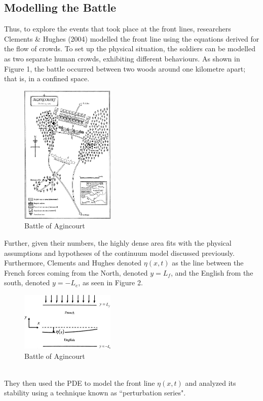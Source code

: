 \documentclass{article}
\begin{document}
\subsection{Modelling the Battle}
Thus, to explore the events that took place at the front lines, researchers Clements \& Hughes (2004) modelled the front line using the equations derived for the flow of crowds. To set up the physical situation, the soldiers can be modelled as two separate human crowds, exhibiting different behaviours. As shown in Figure 1, the battle occurred between two woods around one kilometre apart; that is, in a confined space. \\
\begin{figure}[h]
\centering
\caption{Battle of Agincourt}
\includegraphics[width=0.4\textwidth]{battlefield.jpg}
\end{figure}
Further, given their numbers, the highly dense area fits with the physical assumptions and hypotheses of the continuum model discussed previously. Furthermore, Clements and Hughes denoted $\eta(x,t)$ as the line between the French forces coming from the North, denoted $y=L_f$, and the English from the south, denoted $y=-L_e$, as seen in Figure 2. \\
\begin{figure}[h]
\centering
\caption{Battle of Agincourt}
\includegraphics[width=0.4\textwidth]{mathmodel.jpg}
\end{figure}
\\
They then used the PDE to model the front line $\eta(x,t)$ and analyzed its stability using a technique known as ``perturbation series". 
\end{document}
